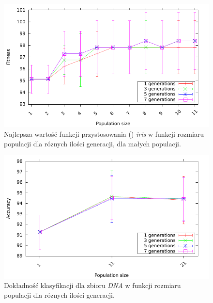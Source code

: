 	
	\begin{figure}
		\includegraphics[scale=0.90]{figures/accuracy/fitness-iris-detailed}
		\caption{Najlepsza wartość funkcji przystosowania ()  \emph{iris} w funkcji rozmiaru populacji dla róznych ilości generacji, dla małych populacji.	\label{fig:fit-iris-detailed}}
	\end{figure}	
	
	\begin{figure}
		\includegraphics[scale=0.90]{figures/accuracy/accuracy-dna}
		\caption{Dokładność klasyfikacji dla zbioru \emph{DNA} w funkcji rozmiaru populacji dla róznych ilości generacji.\label{fig:acc-dna}}
	\end{figure}
	

